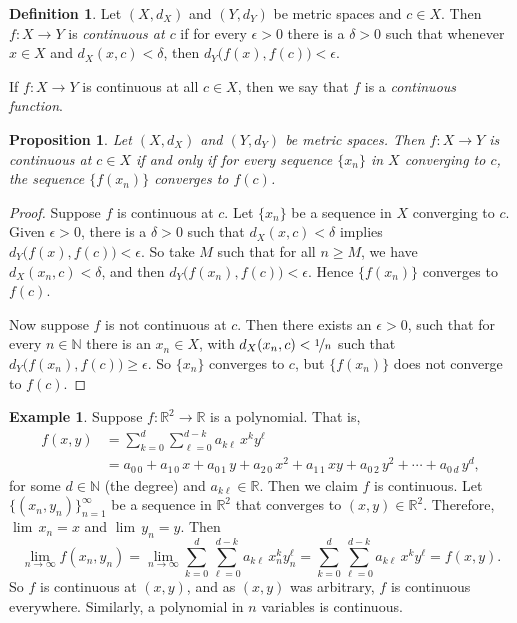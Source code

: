\documentclass[12pt,openany]{book}
\newcommand{\R}{{\mathbb{R}}}
\newcommand{\N}{{\mathbb{N}}}
\theoremstyle{plain}
\newtheorem{prop}[thm]{Proposition}
\theoremstyle{remark}
\theoremstyle{definition}
\newtheorem{defn}[thm]{Definition}
\theoremstyle{exercise}
\theoremstyle{example}
\newtheorem{example}[thm]{Example}
\begin{document}
\begin{defn}
Let $(X,d_X)$ and $(Y,d_Y)$ be metric spaces and $c \in X$.
Then $f \colon X \to Y$ is
\emph{continuous at $c$}
if for every $\epsilon > 0$
there is a $\delta > 0$ such that whenever $x \in X$ and $d_X(x,c) <
\delta$, then
$d_Y\bigl(f(x),f(c)\bigr) < \epsilon$.

If $f \colon X \to Y$ is continuous at all $c \in X$, then we say
that $f$ is a \emph{continuous function}.
\end{defn}

\begin{prop} \label{prop:contiscont}
Let $(X,d_X)$ and $(Y,d_Y)$ be metric spaces.
Then $f \colon X \to Y$ is
continuous at $c \in X$
if and only if for every sequence $\{ x_n \}$ in $X$
converging to $c$, the sequence $\{ f(x_n) \}$ converges
to $f(c)$.
\end{prop}

\begin{proof}
Suppose $f$ is continuous at $c$.  Let $\{ x_n \}$ be a
sequence in $X$ converging to $c$.  Given $\epsilon > 0$,
there is a $\delta > 0$ such that $d_X(x,c) < \delta$ implies
$d_Y\bigl(f(x),f(c)\bigr) < \epsilon$.  So take $M$ such that
for all $n \geq M$, we have $d_X(x_n,c) < \delta$, and then
$d_Y\bigl(f(x_n),f(c)\bigr) < \epsilon$.  Hence $\{ f(x_n) \}$
converges to $f(c)$.

Now suppose $f$ is not continuous at $c$.
Then there exists an $\epsilon > 0$,
such that for every $n \in \N$ there is an $x_n \in X$,
with
$d_X(x_n,c) < \nicefrac{1}{n}$ such that $d_Y\bigl(f(x_n),f(c)\bigr) \geq
\epsilon$.  So $\{ x_n \}$ converges to $c$, but $\{ f(x_n) \}$
does not converge to $f(c)$.
\end{proof}

\begin{example}
Suppose $f \colon \R^2 \to \R$ is a polynomial.  That is,
\begin{equation*}
\begin{split}
f(x,y) & =
\sum_{k=0}^d
\sum_{\ell=0}^{d-k}
a_{k\ell}\,x^ky^\ell \\
& =
a_{0\,0} + a_{1\,0} \, x +
a_{0\,1} \, y+  
a_{2\,0} \, x^2+  
a_{1\,1} \, xy+  
a_{0\,2} \, y^2+ \cdots +
a_{0\,d} \, y^d ,
\end{split}
\end{equation*}
for some $d \in \N$ (the degree) and $a_{k\ell} \in \R$.  Then we claim 
$f$ is continuous.  Let $\{ (x_n,y_n) \}_{n=1}^\infty$ be a sequence
in $\R^2$ that converges to $(x,y) \in \R^2$.  Therefore,
$\lim\, x_n = x$ and $\lim\, y_n = y$.  Then
\begin{equation*}
\lim_{n\to\infty}
f(x_n,y_n) =
\lim_{n\to\infty}
\sum_{k=0}^d
\sum_{\ell=0}^{d-k}
a_{k\ell} \, x_n^ky_n^\ell 
=
\sum_{k=0}^d
\sum_{\ell=0}^{d-k}
a_{k\ell} \, x^ky^\ell
=
f(x,y) .
\end{equation*}
So $f$ is continuous at $(x,y)$, and as $(x,y)$ was arbitrary, $f$ is
continuous everywhere.  Similarly, a
polynomial in $n$ variables is continuous.
\end{example}
\end{document}
